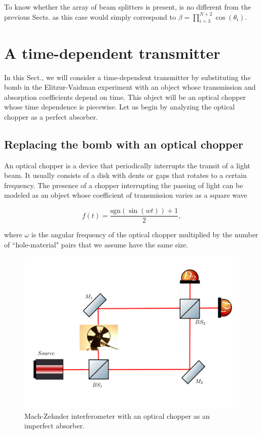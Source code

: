\documentclass[12pt]{book}
\begin{document}
To know whether the array of beam splitters is present, is no different from the previous Sects. as this case would simply correspond to $\beta=\prod_{i=3}^{N+2} \cos(\theta_{i})$.


\section{A time-dependent transmitter}

In this Sect., we will consider a time-dependent transmitter by substituting the bomb in the Elitzur-Vaidman experiment with an object whose transmission and absorption coefficients depend on time. This object will be an optical chopper whose time dependence is piecewise. Let us begin by analyzing the optical chopper as a perfect absorber.

\subsection{Replacing the bomb with an optical chopper }
 

An optical chopper is a device that periodically interrupts the transit of a light beam. It usually consists of a disk with dents or gaps that rotates to a certain frequency. The presence of a chopper interrupting the passing of light can be modeled as an object whose coefficient of transmission  varies as a square wave  

\begin{equation}
f(t)=\frac{\mathrm{sgn}(\sin(wt))+1}{2},
\end{equation}

 where $\omega$ is the angular frequency of the optical chopper multiplied by the number of ``hole-material" pairs that we assume have the same size.

 \begin{figure}[t!]
\centering
\includegraphics[width=\linewidth]{images/machzenhderchopper.png}
\caption{Mach-Zehnder interferometer with an optical chopper as an imperfect absorber.}
\label{chopper}
\end{figure}
\end{document}

